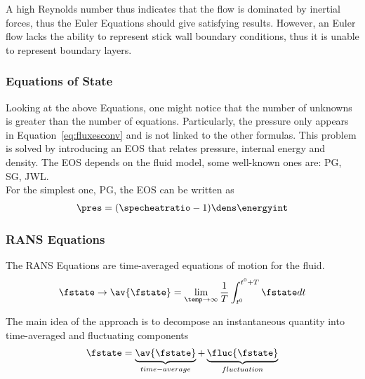 \documentclass[../main.tex]{subfiles}
\begin{document}
A high Reynolds number thus indicates that the flow is dominated by inertial forces, thus the Euler Equations should give satisfying results. However, an Euler flow lacks the ability to represent stick wall boundary conditions, thus it is unable to represent boundary layers.

\subsubsection{Equations of State}
Looking at the above Equations, one might notice that the number of unknowns is greater than the number of equations. Particularly, the pressure only appears in Equation~\eqref{eq:fluxesconv} and is not linked to the other formulas. This problem is solved by introducing an \acf{EOS} that relates pressure, internal energy and density. The \ac{EOS} depends on the fluid model, some well-known ones are: \ac{PG}, \ac{SG}, \ac{JWL}.\\
For the simplest one, PG, the \ac{EOS} can be written as
\begin{align}\label{eq:eos_pg}
\pres=(\specheatratio-1)\dens\energyint
\end{align}


\subsubsection{\acl{RANS} Equations}
The \acf{RANS} Equations are time-averaged equations of motion for the fluid.
\begin{align}\label{eq:rans_averaging}
\fstate \rightarrow \av{\fstate} = \lim_{\temp \to \infty} \frac{1}{T} \int_{t^0}^{t^0+T} \fstate dt
\end{align}

The main idea of the approach is to decompose an instantaneous quantity into time-averaged and fluctuating components
\begin{align}\label{eq:rans_decomposition}
\fstate=\underbrace{\av{\fstate}}_{time-average}+\underbrace{\fluc{\fstate}}_{fluctuation}
\end{align}
\end{document}

